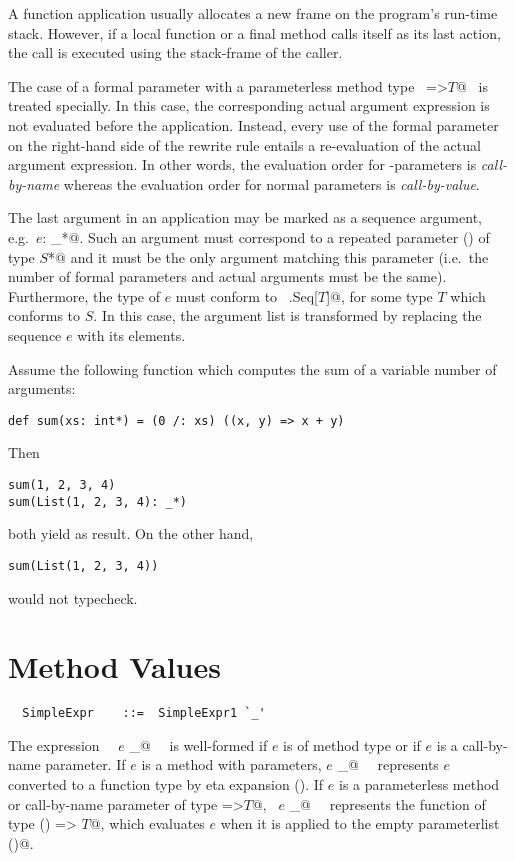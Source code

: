 A function application usually allocates a new frame on the program's
run-time stack. However, if a local function or a final method calls
itself as its last action, the call is executed using the stack-frame
of the caller.

The case of a formal parameter with a parameterless
method type ~\lstinline@=>$T$@~ is treated specially. In this case, the
corresponding actual argument expression is not evaluated before the
application. Instead, every use of the formal parameter on the
right-hand side of the rewrite rule entails a re-evaluation of the
actual argument expression. In other words, the evaluation order for
\code{=>}-parameters is {\em call-by-name} whereas the evaluation
order for normal parameters is {\em call-by-value}.

The last argument in an application may be marked as a sequence
argument, e.g.\ \lstinline@$e$: _*@. Such an argument must correspond
to a repeated parameter () of type
\lstinline@$S$*@ and it must be the only argument matching this
parameter (i.e.\ the number of formal parameters and actual arguments
must be the same). Furthermore, the type of $e$ must conform to
~\lstinline@scala.Seq[$T$]@, for some type $T$ which conforms to
$S$. In this case, the argument list is transformed by replacing the
sequence $e$ with its elements.

\example Assume the following function which computes the sum of a
variable number of arguments:
\begin{lstlisting}
def sum(xs: int*) = (0 /: xs) ((x, y) => x + y)
\end{lstlisting}
Then
\begin{lstlisting}
sum(1, 2, 3, 4)
sum(List(1, 2, 3, 4): _*)
\end{lstlisting}
both yield  as result. On the other hand, 
\begin{lstlisting}
sum(List(1, 2, 3, 4))
\end{lstlisting}
would not typecheck.

\section{Method Values}\label{sec:meth-vals}

\syntax\begin{lstlisting}
  SimpleExpr    ::=  SimpleExpr1 `_'
\end{lstlisting}

The expression ~~\lstinline@$e$ _@~~ is well-formed if $e$ is of method
type or if $e$ is a call-by-name parameter.  If $e$ is a method with
parameters, \lstinline@$e$ _@~~ represents $e$ converted to a function
type by eta expansion (). If $e$ is a
parameterless method or call-by-name parameter of type 
\lstinline@=>$T$@, ~\lstinline@$e$ _@~~ represents the function of type 
\lstinline@() => $T$@, which evaluates $e$ when it is applied to the empty
parameterlist \lstinline@()@. 

